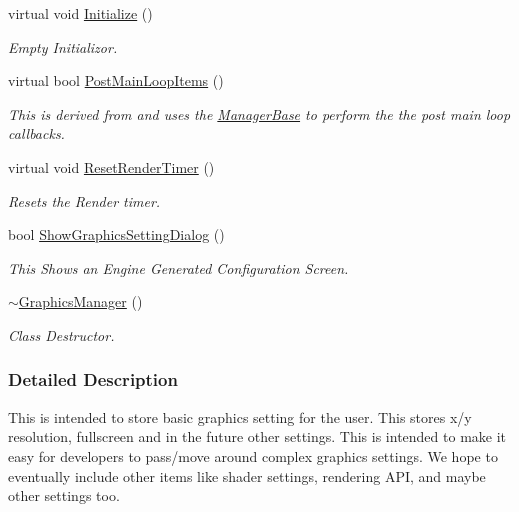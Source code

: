 \begin{DoxyCompactItemize}
virtual void \hyperlink{classphys_1_1GraphicsManager_a554572de5d1cdce37aa1760d6e6e039c}{Initialize} ()
\begin{DoxyCompactList}\small\item\em Empty Initializor. \item\end{DoxyCompactList}\item 
virtual bool \hyperlink{classphys_1_1GraphicsManager_ae2330172be150cd4d12aa2ed62b0474c}{PostMainLoopItems} ()
\begin{DoxyCompactList}\small\item\em This is derived from and uses the \hyperlink{classphys_1_1ManagerBase}{ManagerBase} to perform the the post main loop callbacks. \item\end{DoxyCompactList}\item 
virtual void \hyperlink{classphys_1_1GraphicsManager_ac4b864de93827447bf8f47487da3bf32}{ResetRenderTimer} ()
\begin{DoxyCompactList}\small\item\em Resets the Render timer. \item\end{DoxyCompactList}\item 
bool \hyperlink{classphys_1_1GraphicsManager_adcded385b6442aa5da6097f1edd5471a}{ShowGraphicsSettingDialog} ()
\begin{DoxyCompactList}\small\item\em This Shows an Engine Generated Configuration Screen. \item\end{DoxyCompactList}\item 
\hypertarget{classphys_1_1GraphicsManager_a3a2cb4b7e078faa168025c835062e78f}{
\hyperlink{classphys_1_1GraphicsManager_a3a2cb4b7e078faa168025c835062e78f}{$\sim$GraphicsManager} ()}
\label{classphys_1_1GraphicsManager_a3a2cb4b7e078faa168025c835062e78f}

\begin{DoxyCompactList}\small\item\em Class Destructor. \item\end{DoxyCompactList}\end{DoxyCompactItemize}


\subsubsection{Detailed Description}
This is intended to store basic graphics setting for the user. This stores x/y resolution, fullscreen and in the future other settings. This is intended to make it easy for developers to pass/move around complex graphics settings. We hope to eventually include other items like shader settings, rendering API, and maybe other settings too. 

